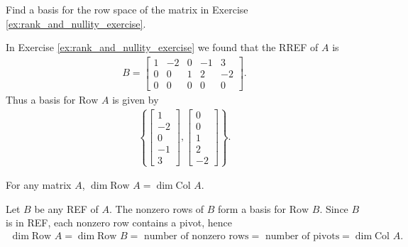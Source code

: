 \documentclass[12pt,letterpaper,reqno]{article}
\numberwithin{equation}{section}
\newcommand{\Col}{\text{Col }}
\newcommand{\Row}{\text{Row }}
\begin{document}
\begin{exercise}
Find a basis for the row space of the matrix in Exercise \ref{ex:rank_and_nullity_exercise}.
\end{exercise}

{\color{red}
\begin{solution}
	In Exercise \ref{ex:rank_and_nullity_exercise} we found that the RREF of $A$ is 
	\begin{align*}
	B=\begin{bmatrix}
		1 & -2 & 0 & -1 & 3 \\
		0 & 0 & 1 & 2 & -2 \\
		0 & 0 & 0 & 0 & 0
	\end{bmatrix}.
\end{align*}
Thus a basis for $\Row A$ is given by
\begin{align*}
	\left\{\begin{bmatrix}
		1\\-2\\0\\-1\\3
	\end{bmatrix}, \begin{bmatrix}
		0 \\ 0 \\ 1 \\ 2 \\ -2
	\end{bmatrix}\right\}.
\end{align*}
\end{solution}}

\begin{thm}[$\dim \Row A=\dim \Col A$]
	For any matrix $A$, $\dim \Row A=\dim \Col A$.
\end{thm}

\begin{pf}
Let $B$	be any REF of $A$. The nonzero rows of $B$ form a basis for $\Row B$. Since $B$ is in REF, each nonzero row contains a pivot, hence
\begin{align*}
	\dim \Row A=\dim \Row B=\text{ number of nonzero rows}=\text{ number of pivots}=\dim \Col A.
\end{align*}
\end{pf}
\end{document}
